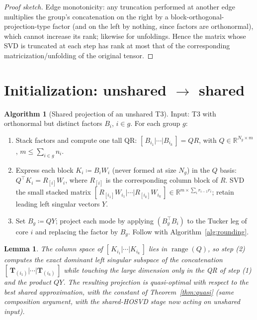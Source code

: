 \documentclass[11pt]{article}
\newtheorem{lemma}[theorem]{Lemma}
\theoremstyle{definition}
\newtheorem{algorithm}[theorem]{Algorithm}
\theoremstyle{remark}
\newcommand{\R}{\mathbb{R}}
\newcommand{\T}{\boldsymbol{T}}
\begin{document}
\begin{proof}[Proof sketch]
Edge monotonicity: any truncation performed at another edge multiplies the
group's concatenation on the right by a block-orthogonal-projection-type
factor (and on the left by nothing, since factors are orthonormal), which
cannot increase its rank; likewise for unfoldings. Hence the matrix whose SVD
is truncated at each step has rank at most that of the corresponding
matricization/unfolding of the original tensor.
\end{proof}

\section{Initialization: unshared $\to$ shared}\label{sec:init}

\begin{algorithm}[Shared projection of an unshared T3]\label{alg:init}
Input: T3 with orthonormal but distinct factors $B_i$, $i \in g$.
For each group $g$:
\begin{enumerate}[label=\emph{(\arabic*)},itemsep=1pt,topsep=2pt]
\item Stack factors and compute one tall QR:
  $[\,B_{i_1} | \cdots | B_{i_k}\,] = Q R$, with
  $Q \in \R^{N_g \times m}$, $m \leq \sum_{i\in g} n_i$.
\item Express each block $K_i \coloneqq B_i W_i$ (never formed at size
  $N_g$) in the $Q$ basis: $Q^\top K_i = R_{[i]} W_i$, where $R_{[i]}$ is the
  corresponding column block of $R$. SVD the small stacked matrix
  $[\,R_{[i_1]} W_{i_1} | \cdots | R_{[i_k]} W_{i_k}\,] \in
  \R^{m \times \sum_i r_{i-1} r_i}$; retain leading left singular vectors
  $Y$.
\item Set $B_g \coloneqq Q Y$; project each mode by applying
  $(B_g^\top B_i)$ to the Tucker leg of core $i$ and replacing the factor by
  $B_g$. Follow with Algorithm~\ref{alg:rounding}.
\end{enumerate}
\end{algorithm}

\begin{lemma}\label{lem:init}
The column space of $[\,K_{i_1} | \cdots | K_{i_k}\,]$ lies in
$\operatorname{range}(Q)$, so step (2) computes the exact dominant left
singular subspace of the concatenation $[\,\T_{(i_1)}|\cdots|\T_{(i_k)}\,]$
while touching the large dimension only in the QR of step (1) and the product
$QY$. The resulting projection is quasi-optimal with respect to the best
shared approximation, with the constant of Theorem~\ref{thm:quasi} (same
composition argument, with the shared-HOSVD stage now acting on unshared
input).
\end{lemma}
\end{document}
